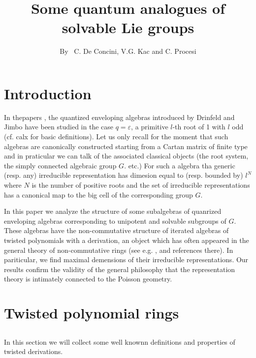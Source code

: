 \title{Some quantum analogues of solvable Lie groups}

\author{By~ C. De Concini, V.G. Kac and C. Procesi}

\date{}
\maketitle

\section*{Introduction}
In the\pageoriginale papers \cite{art4-keyDK1} \cite{art4-keyDK2}, \cite{art4-keyDKP1} \cite{art4-keyDKP2}the quantized enveloping algebras introduced by Drinfeld and Jimbo have been studied in the case $q=\varepsilon$, a primitive $l$-th root of 1 with $l$ odd (cf. calx for basic definitions). Let us only recall for the moment that such algebras are canonically constructed starting from a Cartan matrix of finite type and in praticular we can talk of the associated classical objects (the root system, the simply connected algebraic group $G$. etc.) For such a algebra tha generic (resp. any) irreducible representation has dimesion equal to (resp. bounded by) $l^{N}$ where $N$ is the number of positive roots and the set of irreducible representations has a canonical map to the big cell of the corresponding group $G$.

In this paper we analyze the structure of some subalgebras of quanrized enveloping algebras corresponding to unipotent and solvable subgroups of $G$. These algebras have the non-commutative structure of iterated algebras of twisted polynomials with a derivation, an object which has often appeared in the general theory of non-commutative rings (see e.g. \cite{art4-keyKP}, \cite{art4-keyGL} and references there). In  pariticular, we find maximal demensions of their irreducible representations. Our results confirm the validity of the general philosophy that the representation theory is intimately connected to the Poisson geometry.

\section{Twisted polynomial rings}

\subsection{}
In this section we will collect some well knownn definitions and properties of twisted derivations.\label{art4-subsec-1.1}

